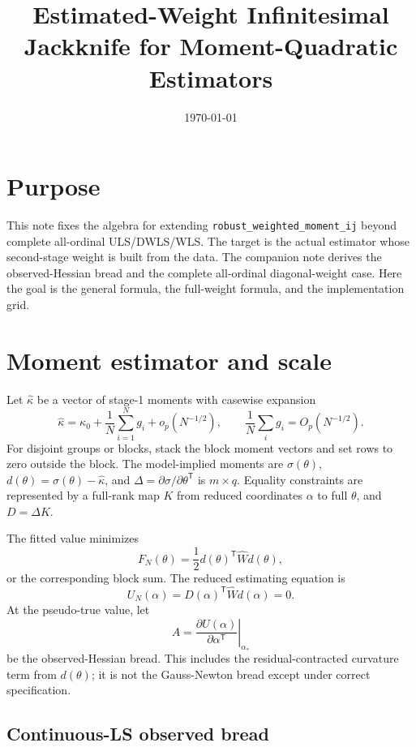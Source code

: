 \documentclass[11pt]{article}
\title{Estimated-Weight Infinitesimal Jackknife for Moment-Quadratic Estimators}
\author{}
\date{\today}
\newcommand{\T}{^{\mathsf T}}
\theoremstyle{plain}
\theoremstyle{remark}
\begin{document}
\maketitle

\section*{Purpose}

This note fixes the algebra for extending \texttt{robust\_weighted\_moment\_ij}
beyond complete all-ordinal ULS/DWLS/WLS. The target is the actual estimator whose
second-stage weight is built from the data. The companion note
 derives the observed-Hessian bread and the
complete all-ordinal diagonal-weight case. Here the goal is the general formula,
the full-weight formula, and the implementation grid.

\section{Moment estimator and scale}

Let $\hat\kappa$ be a vector of stage-1 moments with casewise expansion
\[
  \hat\kappa = \kappa_0 + \frac1N\sum_{i=1}^N g_i + o_p(N^{-1/2}), \qquad
  \frac1N\sum_i g_i = O_p(N^{-1/2}).
\]
For disjoint groups or blocks, stack the block moment vectors and set rows to
zero outside the block. The model-implied moments are $\sigma(\theta)$,
$d(\theta)=\sigma(\theta)-\hat\kappa$, and
$\Delta=\partial\sigma/\partial\theta\T$ is $m\times q$. Equality constraints are
represented by a full-rank map $K$ from reduced coordinates $\alpha$ to full
$\theta$, and $D=\Delta K$.

The fitted value minimizes
\[
  F_N(\theta)=\frac12 d(\theta)\T \hat W d(\theta),
\]
or the corresponding block sum. The reduced estimating equation is
\[
  U_N(\alpha)=D(\alpha)\T \hat W d(\alpha)=0.
\]
At the pseudo-true value, let
\[
  A = \left.\frac{\partial U(\alpha)}{\partial\alpha\T}\right|_{\alpha_*}
\]
be the observed-Hessian bread. This includes the residual-contracted curvature
term from $d(\theta)$; it is not the Gauss-Newton bread except under correct
specification.

\subsection{Continuous-LS observed bread}
\end{document}
